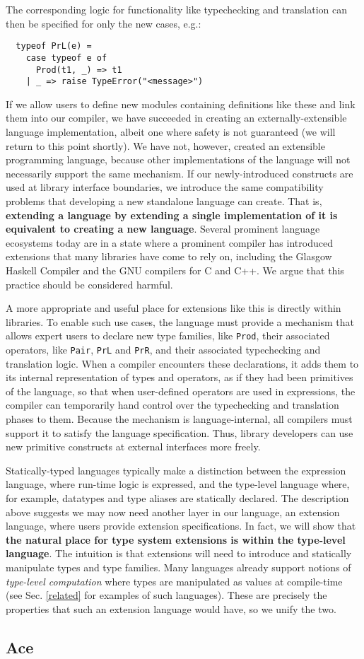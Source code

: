 The corresponding logic for functionality like typechecking and translation can then be specified for only the new cases, e.g.:
\begin{lstlisting}
  typeof PrL(e) = 
    case typeof e of 
      Prod(t1, _) => t1 
    | _ => raise TypeError("<message>")
\end{lstlisting}

If we allow users to define new modules containing definitions like these and link them into our compiler, we have succeeded in creating an externally-extensible language implementation, albeit one where safety is not guaranteed (we will return to this point shortly). We have not, however, created an extensible programming language, because other implementations of the language will not necessarily support the same mechanism. 
If our newly-introduced constructs are used at library interface boundaries, we introduce the same compatibility problems that developing a new standalone language can create. That is, \textbf{extending a language by extending a single implementation of it is equivalent to creating a new language}. Several prominent language ecosystems today are in a state where a prominent compiler has introduced extensions that many libraries have come to rely on, including the Glasgow Haskell Compiler and the GNU compilers for C and C++. We argue that this practice should be considered harmful.

A more appropriate and useful place for extensions like this is directly within libraries. To enable such use cases, the language must provide a mechanism that allows expert users to declare new type families, like \lstinline{Prod}, their associated operators, like \lstinline{Pair}, \lstinline{PrL} and \lstinline{PrR}, and their associated typechecking and translation logic. When a compiler encounters these declarations, it adds them to its internal representation of types and operators, as if they had been primitives of the language, so that when user-defined operators are used in expressions, the compiler can temporarily hand control over the typechecking and translation phases to them. Because the mechanism is {language-internal}, all compilers must support it to satisfy the language specification. Thus, library developers can use new primitive constructs at external interfaces more freely.

Statically-typed languages typically make a distinction between the expression language, where run-time logic is expressed, and the type-level language where, for example, datatypes and type aliases are statically declared. The description above suggests we may now need another layer in our language, an {extension language}, where users provide extension specifications. In fact, we will show that \textbf{the natural place for type system extensions is within the type-level language}. The intuition is that extensions will need to introduce and statically manipulate types and type families. Many languages already support notions of \emph{type-level computation} where types are manipulated as values at compile-time (see Sec. \ref{related} for examples of such languages). These are precisely the properties that such an extension language would have, so we unify the two.


\subsection{Ace}\label{ace}